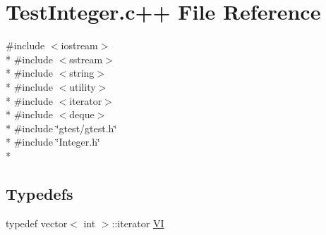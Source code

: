 \hypertarget{TestInteger_8c_09_09}{\section{Test\-Integer.\-c++ File Reference}
\label{TestInteger_8c_09_09}
}
{\ttfamily \#include $<$iostream$>$}\\*
{\ttfamily \#include $<$sstream$>$}\\*
{\ttfamily \#include $<$string$>$}\\*
{\ttfamily \#include $<$utility$>$}\\*
{\ttfamily \#include $<$iterator$>$}\\*
{\ttfamily \#include $<$deque$>$}\\*
{\ttfamily \#include \char`\"{}gtest/gtest.\-h\char`\"{}}\\*
{\ttfamily \#include \char`\"{}Integer.\-h\char`\"{}}\\*
\subsection*{Typedefs}
\begin{DoxyCompactItemize}
\item 
typedef vector$<$ int $>$\-::iterator \hyperlink{TestInteger_8c_09_09_a7f7776c3795227593917f3caa8489aba}{V\-I}
\end{DoxyCompactItemize}
